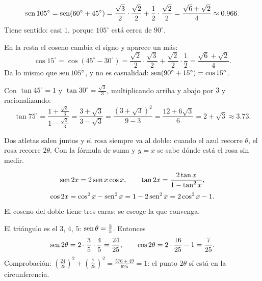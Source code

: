 \documentclass[11pt,a4paper]{article}
\let\nivelorig\nivel
\renewcommand{\nivel}[2]{\Needspace{8\baselineskip}\nivelorig{#1}{#2}}
\begin{document}
\begin{ejemplo}
\[ \operatorname{sen}105^\circ=\operatorname{sen}(60^\circ+45^\circ)=\frac{\sqrt3}{2}\cdot\frac{\sqrt2}{2}+\frac12\cdot\frac{\sqrt2}{2}=\frac{\sqrt6+\sqrt2}{4}\approx0.966. \]
Tiene sentido: casi $1$, porque $105^\circ$ está cerca de $90^\circ$.
\end{ejemplo}

\begin{ejemplo}
En la resta el coseno cambia el signo y aparece un más:
\[ \cos15^\circ=\cos(45^\circ-30^\circ)=\frac{\sqrt2}{2}\cdot\frac{\sqrt3}{2}+\frac{\sqrt2}{2}\cdot\frac12=\frac{\sqrt6+\sqrt2}{4}. \]
Da lo mismo que $\operatorname{sen}105^\circ$, y no es casualidad: $\operatorname{sen}(90^\circ+15^\circ)=\cos15^\circ$.
\end{ejemplo}

\begin{ejemplo}
Con $\tan45^\circ=1$ y $\tan30^\circ=\tfrac{\sqrt3}{3}$, multiplicando arriba y abajo por $3$ y racionalizando:
\[ \tan75^\circ=\frac{1+\frac{\sqrt3}{3}}{1-\frac{\sqrt3}{3}}=\frac{3+\sqrt3}{3-\sqrt3}=\frac{(3+\sqrt3)^2}{9-3}=\frac{12+6\sqrt3}{6}=2+\sqrt3\approx3.73. \]
\end{ejemplo}


Dos atletas salen juntos y el rosa siempre va al doble: cuando el azul recorre $\theta$, el rosa recorre $2\theta$. Con
la fórmula de suma y $y=x$ se sabe dónde está el rosa sin medir.

\begin{propiedad}
\[ \operatorname{sen}2x=2\operatorname{sen} x\cos x,\qquad \tan2x=\frac{2\tan x}{1-\tan^2x}, \]
\[ \cos2x=\cos^2x-\operatorname{sen}^2x=1-2\operatorname{sen}^2x=2\cos^2x-1. \]
El coseno del doble tiene tres caras: se escoge la que convenga.
\end{propiedad}

\begin{ejemplo}[Del video: $\cos\theta=\tfrac45$, con $\theta$ agudo]
El triángulo es el $3$, $4$, $5$: $\operatorname{sen}\theta=\tfrac35$. Entonces
\[ \operatorname{sen}2\theta=2\cdot\frac35\cdot\frac45=\frac{24}{25},\qquad \cos2\theta=2\cdot\frac{16}{25}-1=\frac{7}{25}. \]
Comprobación: $\left(\tfrac{24}{25}\right)^2+\left(\tfrac{7}{25}\right)^2=\tfrac{576+49}{625}=1$: el punto $2\theta$ sí está en la circunferencia.
\end{ejemplo}
\end{document}
